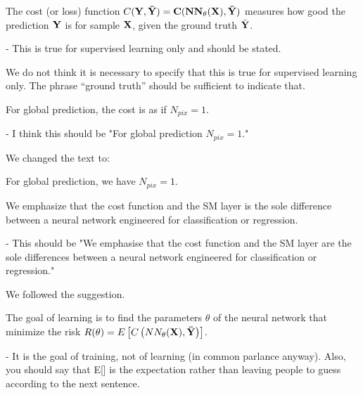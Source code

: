 \documentclass[12pt,a4paper]{article}
\newcommand{\nati}[1]{{\color[rgb]{.1,.6,.1}{NP: #1}}}
\newcommand{\mdeff}[1]{{\color[rgb]{.1,.6,.1}{MD: #1}}}
\newcommand{\todo}[1]{{\color[rgb]{.6,.1,.6}{TODO: #1}}}
\newcommand{\1}{\b{1}}              %
\newcommand{\0}{\b{0}}              %
\begin{document}
\begin{mdframed}[style=comment]
The cost (or loss) function $C(\bf{Y},\bar{\bf{Y}}) = C(NN_\theta(\bf{X}),\bar{\bf{Y}})$ measures how good the prediction $\bf{Y}$ is for sample $\bf{X}$, given the ground truth $\bar{\bf{Y}}$.

- This is true for supervised learning only and should be stated.
\end{mdframed}

We do not think it is necessary to specify that this is true for supervised learning only.
The phrase ``ground truth'' should be sufficient to indicate that.

\begin{mdframed}[style=comment]
For global prediction, the cost is as if $N_{pix} = 1$.

- I think this should be "For global prediction $N_{pix} = 1$."
\end{mdframed}

We changed the text to:
\begin{mdframed}[style=manuscript]
	For global prediction, we have $N_{pix} = 1$.
\end{mdframed}


\begin{mdframed}[style=comment]
We emphasize that the cost function and the SM layer is the sole difference between a neural network engineered for classification or regression.

- This should be "We emphasise that the cost function and the SM layer are the sole differences between a neural network engineered for classification or regression."
\end{mdframed}

We followed the suggestion.

\begin{mdframed}[style=comment]
The goal of learning is to find the parameters $\theta$ of the neural network that minimize the risk $R(\theta) = E\left[C\left(NN_\theta(\bf{X}),\bar{\bf{Y}}\right)\right]$.

- It is the goal of training, not of learning (in common parlance anyway). Also, you should say that E[] is the expectation rather than leaving people to guess according to the next sentence.
\end{mdframed}
\end{document}
